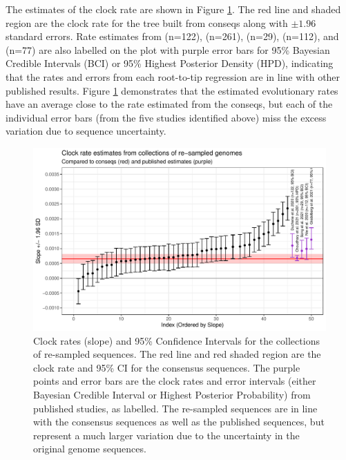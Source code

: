 \documentclass[10pt]{article}
\begin{document}
The estimates of the clock rate are shown in Figure \ref{fig:RTT_slope}. The red line and shaded region are the clock rate for the tree built from conseqs along with $\pm 1.96$ standard errors. Rate estimates from \citet{ducheneTemporalSignalPhylodynamic2020} (n=122), \citet{choudharySevereAcuteRespiratory2021} (n=261), \citet{songGenomicEpidemiologySARSCoV22021} (n=29), \citet{niePhylogeneticPhylodynamicAnalyses2020} (n=112), and \citet{geidelbergGenomicEpidemiologyDensely2021} (n=77) are also labelled on the plot with purple error bars for 95\% Bayesian Credible Intervals (BCI) or 95\% Highest Posterior Density (HPD), indicating that the rates and errors from each root-to-tip regression are in line with other published results.
Figure \ref{fig:RTT_slope} demonstrates that the estimated evolutionary rates have an average close to the rate estimated from the conseqs, but each of the individual error bars (from the five studies identified above) miss the excess variation due to sequence uncertainty.


\begin{figure}
\includegraphics[width=\textwidth]{figs/RTT_Slope.pdf}
\caption{\label{fig:RTT_slope}Clock rates (slope) and 95\% Confidence Intervals for the collections of re-sampled sequences. The red line and red shaded region are the clock rate and 95\% CI for the consensus sequences. The purple points and error bars are the clock rates and error intervals (either Bayesian Credible Interval or Highest Posterior Probability) from published studies, as labelled. The re-sampled sequences are in line with the consensus sequences as well as the published sequences, but represent a much larger variation due to the uncertainty in the original genome sequences.}
\end{figure}
\end{document}
